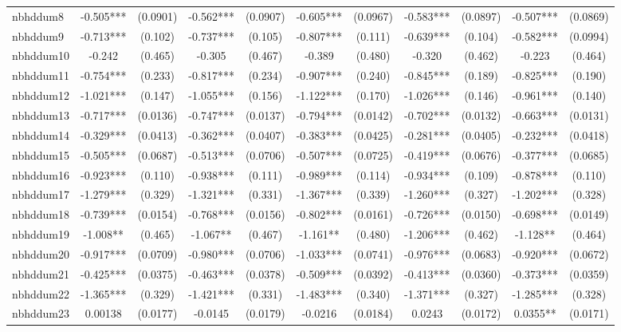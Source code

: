 \documentclass[]{article}
\begin{document}
\begin{tabular}{lcccccccccc}
nbhddum8 & -0.505*** & (0.0901) & -0.562*** & (0.0907) & -0.605*** & (0.0967) & -0.583*** & (0.0897) & -0.507*** & (0.0869) \\
nbhddum9 & -0.713*** & (0.102) & -0.737*** & (0.105) & -0.807*** & (0.111) & -0.639*** & (0.104) & -0.582*** & (0.0994) \\
nbhddum10 & -0.242 & (0.465) & -0.305 & (0.467) & -0.389 & (0.480) & -0.320 & (0.462) & -0.223 & (0.464) \\
nbhddum11 & -0.754*** & (0.233) & -0.817*** & (0.234) & -0.907*** & (0.240) & -0.845*** & (0.189) & -0.825*** & (0.190) \\
nbhddum12 & -1.021*** & (0.147) & -1.055*** & (0.156) & -1.122*** & (0.170) & -1.026*** & (0.146) & -0.961*** & (0.140) \\
nbhddum13 & -0.717*** & (0.0136) & -0.747*** & (0.0137) & -0.794*** & (0.0142) & -0.702*** & (0.0132) & -0.663*** & (0.0131) \\
nbhddum14 & -0.329*** & (0.0413) & -0.362*** & (0.0407) & -0.383*** & (0.0425) & -0.281*** & (0.0405) & -0.232*** & (0.0418) \\
nbhddum15 & -0.505*** & (0.0687) & -0.513*** & (0.0706) & -0.507*** & (0.0725) & -0.419*** & (0.0676) & -0.377*** & (0.0685) \\
nbhddum16 & -0.923*** & (0.110) & -0.938*** & (0.111) & -0.989*** & (0.114) & -0.934*** & (0.109) & -0.878*** & (0.110) \\
nbhddum17 & -1.279*** & (0.329) & -1.321*** & (0.331) & -1.367*** & (0.339) & -1.260*** & (0.327) & -1.202*** & (0.328) \\
nbhddum18 & -0.739*** & (0.0154) & -0.768*** & (0.0156) & -0.802*** & (0.0161) & -0.726*** & (0.0150) & -0.698*** & (0.0149) \\
nbhddum19 & -1.008** & (0.465) & -1.067** & (0.467) & -1.161** & (0.480) & -1.206*** & (0.462) & -1.128** & (0.464) \\
nbhddum20 & -0.917*** & (0.0709) & -0.980*** & (0.0706) & -1.033*** & (0.0741) & -0.976*** & (0.0683) & -0.920*** & (0.0672) \\
nbhddum21 & -0.425*** & (0.0375) & -0.463*** & (0.0378) & -0.509*** & (0.0392) & -0.413*** & (0.0360) & -0.373*** & (0.0359) \\
nbhddum22 & -1.365*** & (0.329) & -1.421*** & (0.331) & -1.483*** & (0.340) & -1.371*** & (0.327) & -1.285*** & (0.328) \\
nbhddum23 & 0.00138 & (0.0177) & -0.0145 & (0.0179) & -0.0216 & (0.0184) & 0.0243 & (0.0172) & 0.0355** & (0.0171) \\

\end{tabular}
\end{document}
